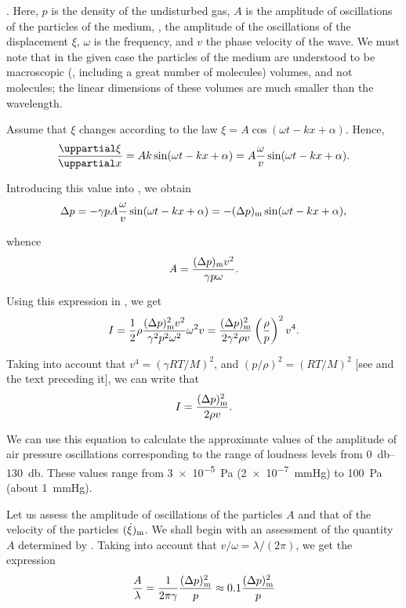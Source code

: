 .
Here, $p$ is the density of the undisturbed gas, $A$ is the amplitude of oscillations of the particles of the medium, \ie, the amplitude of the oscillations of the displacement $\xi$, $\omega$ is the frequency, and $v$ the phase velocity of the wave.
We must note that in the given case the particles of the medium are understood to be macroscopic (\ie, including a great number of molecules) volumes, and not molecules; the linear dimensions of these volumes are much smaller than the wavelength.

Assume that $\xi$ changes according to the law $\xi=A\cos(\omega t-kx+\alpha)$.
Hence,
\begin{equation*}
	\diffpartial{\xi}{x} = Ak \sin(\omega t - k x + \alpha) = A \frac{\omega}{v} \sin(\omega t - k x + \alpha).
\end{equation*}

\noindent
Introducing this value into , we obtain
\begin{equation*}
	\Delta{p} = - \gamma p A \frac{\omega}{v} \sin(\omega t - kx + \alpha) = - (\Delta{p})_{\text{m}} \sin(\omega t - kx + \alpha),
\end{equation*}

\noindent
whence
\begin{equation}\label{eq:14_73}
	A = \frac{(\Delta{p})_{\text{m}} v^2}{\gamma p \omega}.
\end{equation}

\noindent
Using this expression in , we get
\begin{equation*}
	I = \frac{1}{2} \rho \frac{(\Delta{p})^2_{\text{m}} v^2}{\gamma^2 p^2 \omega^2} \omega^2 v = \frac{(\Delta{p})^2_{\text{m}}}{2 \gamma^2 \rho v} \left(\frac{\rho}{p}\right)^2 v^4.
\end{equation*}

\noindent
Taking into account that $v^4 = (\gamma RT/M)^2$, and $(p/\rho)^2 = (RT/M)^2$ [see  and the text preceding it], we can write that
\begin{equation}\label{eq:14_74}
	I = \frac{(\Delta{p})^2_{\text{m}}}{2 \rho v}.
\end{equation}

\noindent
We can use this equation to calculate the approximate values of the amplitude of air pressure oscillations corresponding to the range of loudness levels from \SIrange{0}{130}{\decibel}.
These values range from \SI{3e-5}{\pascal} (\SI{2e-7}{\mmHg}) to \SI{100}{\pascal} (about \SI{1}{\mmHg}).

Let us assess the amplitude of oscillations of the particles $A$ and that of the velocity of the particles $(\dot{\xi})_{\text{m}}$.
We shall begin with an assessment of the quantity $A$ determined by .
Taking into account that $v/\omega=\lambda/(2\pi)$, we get the expression
\begin{equation}\label{eq:14_75}
	\frac{A}{\lambda} = \frac{1}{2\pi\gamma} \frac{(\Delta{p})^2_{\text{m}}}{p} \approx 0.1 \frac{(\Delta{p})^2_{\text{m}}}{p}
\end{equation}

